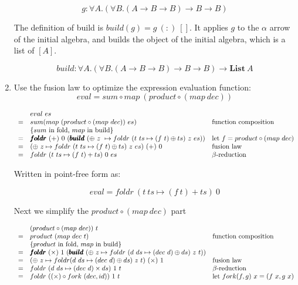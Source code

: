 \documentclass[UTF8]{article}
\begin{document}
\begin{enumerate}
\[
g : \forall A. (\forall B. (A \to B \to B) \to B \to B)
\]

The definition of build is $build(g) = g\ (:)\ []$. It applies $g$ to the $\alpha$ arrow of the initial algebra, and builds the object of the initial algebra, which is a list of $[A]$.

\[
build : \forall A. (\forall B. (A \to B \to B) \to B \to B) \to \mathbf{List}\ A
\]

\item{Use the fusion law to optimize the expression evaluation function:
\[
eval = sum \circ map\ (product \circ (map\ dec))
\]}

\[
\resizebox{\textwidth}{!}{\ensuremath{
\begin{array}{cll}
  & eval\ es \\
= & sum (map\ (product \circ (map\ dec))\ es) & \text{function composition} \\
  & \{ \text{$sum$ in fold, $map$ in build} \} \\
= & \pmb{foldr}\ (+)\ 0\ (\pmb{build}\ (\oplus\ z\ \mapsto foldr\ (t\ ts \mapsto (f\ t) \oplus ts)\ z\ es)) & \text{let $f = product \circ (map\ dec)$} \\
= & (\oplus\ z \mapsto foldr\ (t\ ts \mapsto (f\ t) \oplus ts)\ z\ es)\ (+)\ 0 & \text{fusion law} \\
= & foldr\ (t\ ts \mapsto (f\ t) + ts)\ 0\ es & \text{$\beta$-reduction} \\
\end{array}
}}
\]

Written in point-free form as:

\[
eval = foldr\ (t\ ts \mapsto (f\ t) + ts)\ 0
\]

Next we simplify the $product \circ (map\ dec)$ part

\[
\resizebox{\textwidth}{!}{\ensuremath{
\begin{array}{cll}
  & (product \circ (map\ dec))\ t \\
= & product\ (map\ dec\ t) & \text{function composition} \\
  & \{ \text{$product$ in fold, $map$ in build} \} \\
= & \pmb{foldr}\ (\times)\ 1\ (\pmb{build}\ (\oplus\ z \mapsto foldr\ (d\ ds \mapsto (dec\ d) \oplus ds)\ z\ t)) \\
= & (\oplus\ z \mapsto foldr (d\ ds \mapsto (dec\ d) \oplus ds)\ z\ t)\ (\times)\ 1 & \text{fusion law} \\
= & foldr\ (d\ ds \mapsto (dec\ d) \times ds)\ 1\ t & \text{$\beta$-reduction} \\
= & foldr\ ((\times) \circ fork\ (dec, id))\ 1\ t & \text{let $fork(f, g)\ x = (f\ x, g\ x)$} \\
\end{array}
}}
\]


\end{enumerate}
\end{document}
